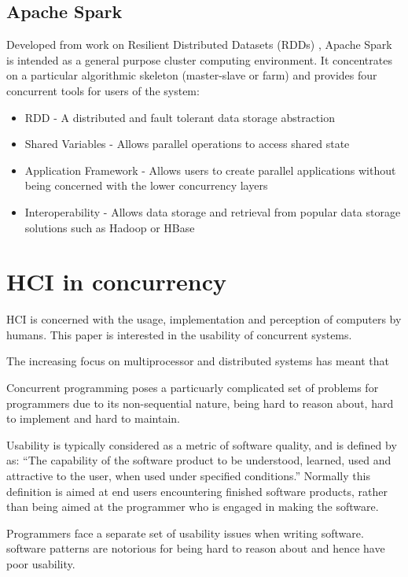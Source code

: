 \documentclass{sig-alternate}
\begin{document}
\subsection{Apache Spark}
Developed from work on Resilient Distributed Datasets (RDDs)  \cite{zaharia14:_archit_fast_gener_data_proces_large_clust},  Apache Spark is intended as a general purpose cluster computing environment. It concentrates on a particular algorithmic skeleton (master-slave or farm) and provides four concurrent tools for users of the system:

\begin{itemize}
\item RDD - A distributed and fault tolerant data storage abstraction
\item Shared Variables - Allows parallel operations to access shared state
\item Application Framework - Allows users to create parallel applications without being concerned with the lower concurrency layers
\item Interoperability - Allows data storage and retrieval from popular data storage solutions such as Hadoop or HBase
\end{itemize}

\section{HCI in concurrency}
HCI is concerned with the usage, implementation and perception of computers by humans. This paper is interested in the usability of concurrent systems. 

The increasing focus on multiprocessor and distributed systems has meant that 

Concurrent programming poses a particuarly complicated set of problems for programmers due to its non-sequential nature, being hard to reason about, hard to implement and hard to maintain. 


Usability is typically considered as a metric of software quality, and is defined by \cite{9126} as: ``The capability of the software product to be understood, learned, used and attractive to the user, when used under specified conditions.'' Normally this definition is aimed at end users encountering finished software products, rather than being aimed at the programmer who is engaged in making the software.





Programmers face a separate set of usability issues when writing software.  software patterns are notorious for being hard to reason about and hence have poor usability.
\end{document}
